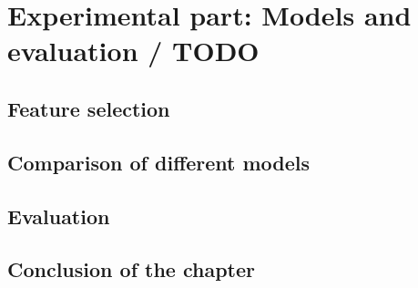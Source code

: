 \chapter{Experimental part: Models and evaluation / TODO}
\label{chap:model}

\section{Feature selection}

\section{Comparison of different models}

\section{Evaluation}

\section*{Conclusion of the chapter}
\label{sec:eval}